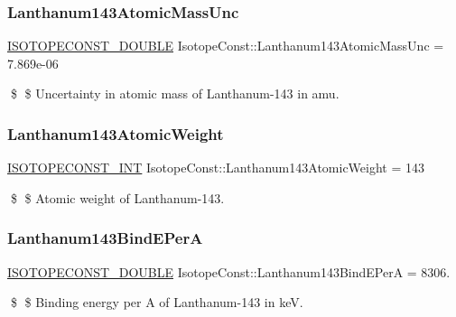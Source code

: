 \subsubsection{\texorpdfstring{Lanthanum143\+Atomic\+Mass\+Unc}{Lanthanum143AtomicMassUnc}}
{\footnotesize\ttfamily \mbox{\hyperlink{group___isotope_const-_macros_ga8f45a7272ce02c0b4c65c44636ed719a}{I\+S\+O\+T\+O\+P\+E\+C\+O\+N\+S\+T\+\_\+\+D\+O\+U\+B\+LE}} Isotope\+Const\+::\+Lanthanum143\+Atomic\+Mass\+Unc = 7.\+869e-\/06}

\$ \$ Uncertainty in atomic mass of Lanthanum-\/143 in amu. \mbox{\label{group___isotope_const-_lanthanum-_la143_ga065070e4a3d53e246ae64c79d2f32d63}} 
\subsubsection{\texorpdfstring{Lanthanum143\+Atomic\+Weight}{Lanthanum143AtomicWeight}}
{\footnotesize\ttfamily \mbox{\hyperlink{group___isotope_const-_macros_ga5f18360b3e99483a35c32d789e62621c}{I\+S\+O\+T\+O\+P\+E\+C\+O\+N\+S\+T\+\_\+\+I\+NT}} Isotope\+Const\+::\+Lanthanum143\+Atomic\+Weight = 143}

\$ \$ Atomic weight of Lanthanum-\/143. \mbox{\label{group___isotope_const-_lanthanum-_la143_gad76877c8351d48112690c8705799e0bf}} 
\subsubsection{\texorpdfstring{Lanthanum143\+Bind\+E\+PerA}{Lanthanum143BindEPerA}}
{\footnotesize\ttfamily \mbox{\hyperlink{group___isotope_const-_macros_ga8f45a7272ce02c0b4c65c44636ed719a}{I\+S\+O\+T\+O\+P\+E\+C\+O\+N\+S\+T\+\_\+\+D\+O\+U\+B\+LE}} Isotope\+Const\+::\+Lanthanum143\+Bind\+E\+PerA = 8306.}

\$ \$ Binding energy per A of Lanthanum-\/143 in keV. \mbox{\label{group___isotope_const-_lanthanum-_la143_ga443fe5956682651194476cc61efcb1cd}} 
